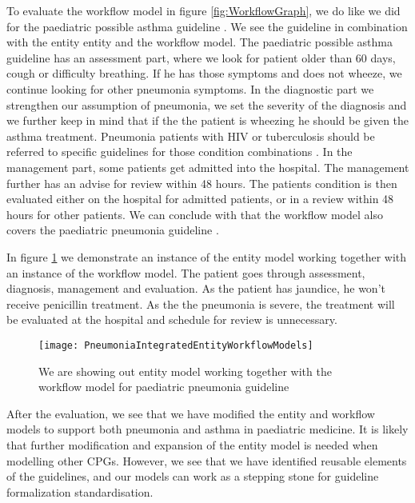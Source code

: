 To evaluate the workflow model in figure \ref{fig:WorkflowGraph}, we do like we did for the paediatric possible asthma guideline \parencite{RepublicofKeny2016}. We see the guideline in combination with the entity entity and the workflow model. The paediatric possible asthma guideline \parencite{RepublicofKeny2016} has an assessment part, where we look for patient older than 60 days, cough or difficulty breathing. If he has those symptoms and does not wheeze, we continue looking for other pneumonia symptoms. In the diagnostic part we strengthen our assumption of pneumonia, we set the severity of the diagnosis and we further keep in mind that if the the patient is wheezing he should be given the asthma treatment. Pneumonia patients with HIV or tuberculosis should be referred to specific guidelines for those condition combinations \parencite{RepublicofKeny2016}. In the management part, some patients get admitted into the hospital. The management further has an advise for review within 48 hours. The patients condition is then evaluated either on the hospital for admitted patients, or in a review within 48 hours for other patients. We can conclude with that the workflow model  also covers the paediatric pneumonia guideline \parencite{RepublicofKeny2016}.

In figure \ref{fig:PneumoniaPneumoniaIntegratedEntityWorkflowModels} we demonstrate an instance of the entity model working together with an instance of the workflow model. The patient goes through assessment, diagnosis, management and evaluation. As the patient has jaundice, he won't receive penicillin treatment. As the the pneumonia is severe, the treatment will be evaluated at the hospital and schedule for review is unnecessary. 

\begin{figure}[h!]
	\texttt{[image: PneumoniaIntegratedEntityWorkflowModels]}
	\caption {We are showing out entity model working together with the workflow model for paediatric pneumonia guideline \parencite{RepublicofKeny2016}}	
	\label{fig:PneumoniaPneumoniaIntegratedEntityWorkflowModels}
\end{figure}

After the evaluation, we see that we have modified the entity and workflow models to support both pneumonia and asthma in paediatric medicine. It is likely that further modification and expansion of the entity model is needed when modelling other CPGs. However, we see that we have identified reusable elements of the guidelines, and our models can work as a stepping stone for guideline formalization standardisation.


